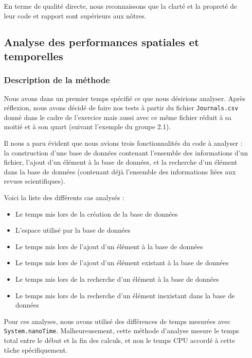 \documentclass[a4paper,10pt]{article}
\begin{document}
	En terme de qualité directe, nous reconnaissons que la clarté et la propreté de leur code et rapport sont supérieurs aux nôtres.

\subsection{Analyse des performances spatiales et temporelles}

\subsubsection{Description de la méthode}

	Nous avons dans un premier temps spécifié ce que nous désirions analyser. Après réflexion, nous avons décidé de faire nos tests à partir du fichier \texttt{Journals.csv} donné dans le cadre de l'exercice mais aussi avec ce même fichier réduit à sa moitié et à son quart (suivant l'exemple du groupe 2.1). 
	
	Il nous a paru évident que nous avions trois fonctionnalités du code à analyser : la construction d'une base de données contenant l'ensemble des informations d'un fichier, l'ajout d'un élément à la base de données, et la recherche d'un élément dans la base de données (contenant déjà l'ensemble des informations liées aux revues scientifiques).

Voici la liste des différents cas analysés :

\begin{itemize}
\item Le temps mis lors de la création de la base de données
\item L'espace utilisé par la base de données
\item Le temps mis lors de l'ajout d'un élément à la base de données
\item Le temps mis lors de l'ajout d'un élément existant à la base de données
\item Le temps mis lors de la recherche d'un élément à la base de données
\item Le temps mis lors de la recherche d'un élément inexistant dans la base de données
\end{itemize}
 
	Pour ces analyses, nous avons utilisé des différences de temps mesurées avec \texttt{System.nanoTime}. Malheureusement, cette méthode d'analyse mesure le temps total entre le début et la fin des calculs, et non le temps CPU accordé à cette tâche spécifiquement. 
	
\end{document}
